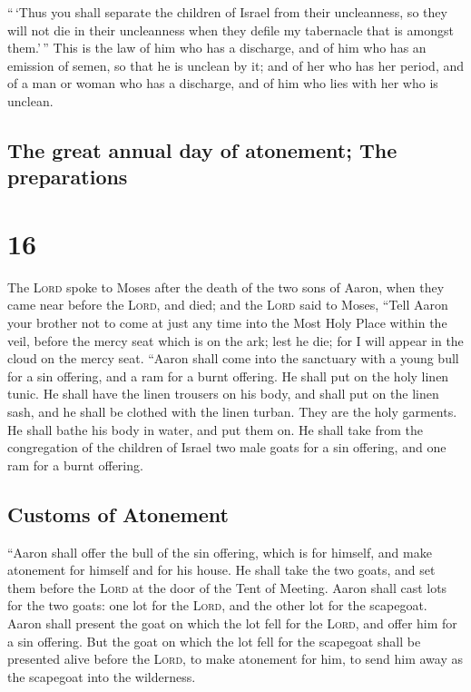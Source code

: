  ``\,`Thus you shall separate the children of Israel from
their uncleanness, so they will not die in their uncleanness when they
defile my tabernacle that is amongst them.'\,''  This is
the law of him who has a discharge, and of him who has an emission of
semen, so that he is unclean by it;  and of her who has
her period, and of a man or woman who has a discharge, and of him who
lies with her who is unclean.

\hypertarget{the-great-annual-day-of-atonement-the-preparations}{%
\subsection{The great annual day of atonement; The
preparations}\label{the-great-annual-day-of-atonement-the-preparations}}

\hypertarget{section-15}{%
\section{16}\label{section-15}}

 The \textsc{Lord} spoke to Moses after the death of the
two sons of Aaron, when they came near before the \textsc{Lord}, and
died;  and the \textsc{Lord} said to Moses, ``Tell Aaron
your brother not to come at just any time into the Most Holy Place
within the veil, before the mercy seat which is on the ark; lest he die;
for I will appear in the cloud on the mercy seat.  ``Aaron
shall come into the sanctuary with a young bull for a sin offering, and
a ram for a burnt offering.  He shall put on the holy
linen tunic. He shall have the linen trousers on his body, and shall put
on the linen sash, and he shall be clothed with the linen turban. They
are the holy garments. He shall bathe his body in water, and put them
on.  He shall take from the congregation of the children
of Israel two male goats for a sin offering, and one ram for a burnt
offering.

\hypertarget{customs-of-atonement}{%
\subsection{Customs of Atonement}\label{customs-of-atonement}}

 ``Aaron shall offer the bull of the sin offering, which
is for himself, and make atonement for himself and for his house.
 He shall take the two goats, and set them before the
\textsc{Lord} at the door of the Tent of Meeting.  Aaron
shall cast lots for the two goats: one lot for the \textsc{Lord}, and
the other lot for the scapegoat.  Aaron shall present the
goat on which the lot fell for the \textsc{Lord}, and offer him for a
sin offering.  But the goat on which the lot fell for the
scapegoat shall be presented alive before the \textsc{Lord}, to make
atonement for him, to send him away as the scapegoat into the
wilderness.


